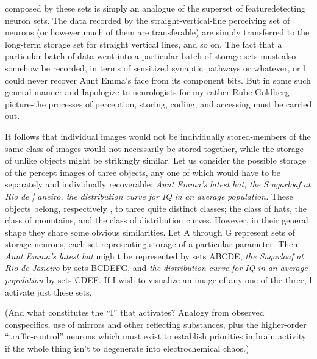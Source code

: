 
composed by these sets is simply an analogue of the superset of feature\-detecting neuron sets. The data recorded by the straight-vertical-line perceiving set of neurons (or however much of them are transferable) are simply transferred to the long-term storage set for straight vertical lines, and so on. The fact that a particular batch of data went into a particular batch of storage sets must also somehow be recorded, in terms of sensitized synaptic pathways or whatever, or l could never recover Aunt Emma's face from its component bits. But in some such general manner-and Iapologize to neurologists for my rather Rube Goldberg picture-the processes of perception, storing, coding, and accessing must be carried out.

It follows that individual images would not be individually stored-members of the same class of images would not necessarily be stored together, while the storage of unlike objects might be strikingly similar. Let us consider the possible storage of the percept images of three objects, any one of which would have to be separately and individually recoverable: \textit{Aunt} \textit{Emma's} \textit{latest} \textit{hat,} \textit{the} \textit{S} \textit{ugarloaf} \textit{at} \textit{Rio} \textit{de} \textit{]} \textit{aneiro, the} \textit{distribution} \textit{curve} \textit{for} \textit{IQ} \textit{in} \textit{an} \textit{average} \textit{population.} These objects belong, respectively , to three quite distinct classes; the class of hats, the class of mountains, and the class of distribution curves. However, in their general shape they share some obvious simi\-larities. Let A through G represent sets of storage neurons, each set representing storage of a particular parameter. Then \textit{Aunt} \textit{Emma's latest} \textit{hat} migh t be represented by sets ABCDE, \textit{the} \textit{Sugarloaf} \textit{at} \textit{Rio} \textit{de} \textit{Janeiro} by sets BCDEFG, and \textit{the} \textit{distribution} \textit{curve} \textit{for} \textit{IQ} \textit{in} \textit{an} \textit{average} \textit{population} by sets CDEF. If I wish to visualize an image of any one of the three, l activate just these sets,

(And what constitutes the ``I'' that activates? Analogy from observed conspecifics, use of mirrors and other reflecting substances, plus the higher-order ``traffic-control'' neurons which must exist to establish priorities in brain activity if the whole thing isn't to degen\-erate into electrochemical chaos.)

